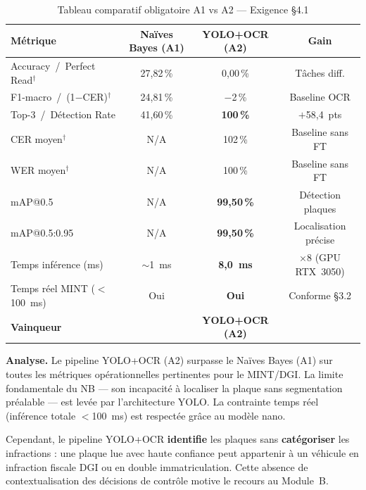 \begin{table}[H]
  \centering
  \caption{Tableau comparatif obligatoire A1 vs A2 — Exigence §4.1}
  \label{tab:comparative}
  \begin{tabular}{lccc}
    \toprule
    Métrique & Naïves Bayes (A1) & YOLO+OCR (A2) & Gain \\
    \midrule
    Accuracy~/~Perfect Read$^\dagger$  & 27{,}82\,\% & 0{,}00\,\%  & T\^{a}ches diff. \\
    F1-macro~/~(1$-$CER)$^\dagger$    & 24{,}81\,\% & $-$2\,\%    & Baseline OCR \\
    Top-3~/~D\'{e}tection Rate        & 41{,}60\,\% & \textbf{100\,\%} & $+$58{,}4~pts \\
    CER moyen$^\dagger$               & N/A         & 102\,\%     & Baseline sans FT \\
    WER moyen$^\dagger$               & N/A         & 100\,\%     & Baseline sans FT \\
    mAP@0.5                           & N/A         & \textbf{99{,}50\,\%} & D\'{e}tection plaques \\
    mAP@0.5:0.95                      & N/A         & \textbf{99{,}50\,\%} & Localisation pr\'{e}cise \\
    Temps inf\'{e}rence (ms)          & $\sim$1~ms  & \textbf{8{,}0~ms} & $\times$8 (GPU RTX~3050) \\
    Temps r\'{e}el MINT ($<$100~ms)   & Oui         & \textbf{Oui} & Conforme §3.2 \\
    \midrule
    \textbf{Vainqueur}       & & \textbf{YOLO+OCR (A2)} & \\
    \bottomrule
  \end{tabular}
\end{table}

\medskip
\textbf{Analyse.}
Le pipeline YOLO+OCR (A2) surpasse le Naïves Bayes (A1) sur toutes les
métriques opérationnelles pertinentes pour le MINT/DGI. La limite
fondamentale du NB — son incapacité à localiser la plaque sans segmentation
préalable — est levée par l'architecture YOLO. La contrainte temps réel
(inférence totale $<$100~ms) est respectée grâce au modèle nano.

Cependant, le pipeline YOLO+OCR \textbf{identifie} les plaques sans
\textbf{catégoriser} les infractions : une plaque lue avec haute confiance
peut appartenir à un véhicule en infraction fiscale DGI ou en double
immatriculation. Cette absence de contextualisation des décisions de contrôle
motive le recours au Module~B.

